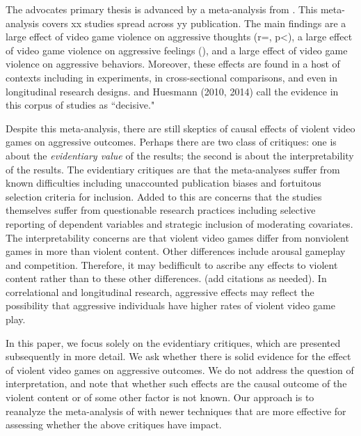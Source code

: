 \documentclass[man]{apa6}
\begin{document}
The advocates primary thesis is advanced by a meta-analysis from \citep{Anderson:etal:2010}.  This meta-analysis covers xx studies spread across yy publication.  The main findings are a large effect of video game violence on aggressive thoughts (r=, p<), a large effect of video game violence on aggressive feelings (), and a large effect of video game violence on aggressive behaviors.  Moreover, these effects are found in a host of contexts including in experiments, in cross-sectional comparisons, and even in longitudinal research designs.   \citet{Bushman:etal:2010} and Huesmann (2010, 2014) call the evidence in this corpus of studies as ``decisive."

Despite this meta-analysis, there are still skeptics of causal effects of violent video games on aggressive outcomes.  Perhaps there are two class of critiques: one is about the {\em evidentiary value} of the results; the second is about the interpretability of the results.   The evidentiary critiques are that the meta-analyses suffer from known difficulties including unaccounted publication biases and fortuitous selection criteria for inclusion.  Added to this are concerns that the studies themselves suffer from questionable research practices including selective reporting of dependent variables and strategic inclusion of moderating covariates.   The interpretability concerns are that violent video games differ from nonviolent games in more than violent content.  Other differences include arousal gameplay and competition.  Therefore, it may bedifficult to ascribe any effects to violent content rather than to these other differences.  (add citations as needed).   In correlational and longitudinal research, aggressive effects may reflect the possibility that aggressive individuals have higher rates of violent video game play.

In this paper, we focus solely on the evidentiary critiques, which are presented subsequently in more detail.  We ask whether there is solid evidence for the effect of violent video games on aggressive outcomes.  We do not address the question of interpretation, and note that whether such effects are the causal outcome of the violent content or of some other factor is not known.  Our approach is to reanalyze the meta-analysis of \citet{Anderson:etal:2010} with newer techniques that are more effective for assessing whether the above  critiques have impact.
\end{document}
